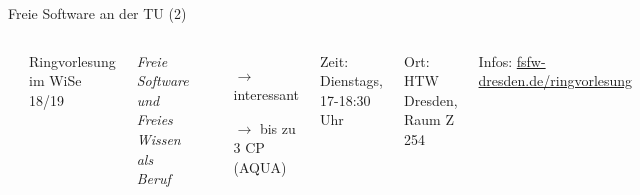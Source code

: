 \documentclass[t]{beamer}
\begin{document}
\begin{frame}[t,label=ct5]{\color{fg}Freie Software an der TU (2)}

\vspace{-5mm}

\begin{columns}

\vspace{-4mm}
\begin{center}
\href{https://fsfw-dresden.de/ringvorlesung}{\includegraphics[width=50mm]{img-src/FSFW-RV}}
\end{center}


  Ringvorlesung im WiSe 18/19
  \medskip

  \begin{center}
  \textit{Freie Software und Freies Wissen als Beruf}
  \end{center}

  \smallskip

  \begin{itemize}
   \item[$\rightarrow$] interessant
   \item[$\rightarrow$] bis zu 3 CP (AQUA)
  \end{itemize}

  \bigskip
  Zeit: Dienstags, 17-18:30 Uhr

  \smallskip
  Ort: HTW Dresden, Raum Z 254

  \bigskip
  Infos: {\scriptsize \url{fsfw-dresden.de/ringvorlesung}}

\end{columns}

\end{frame}

\end{document}
